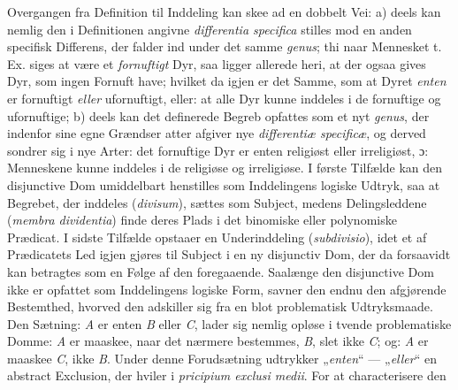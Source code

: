 \documentclass[12pt]{book}
\newcommand{\dsi}{\textup{ɔ:}}
\newcommand{\opage}[1]{\marginnote{\footnotesize\textit{[#1]}}}
\begin{document}
Overgangen fra Definition til Inddeling kan skee ad en dobbelt Vei: a) deels kan
nemlig den i Definitionen angivne \textit{differentia specifica} stilles mod en
anden specifisk Differens, der falder ind under det samme \textit{genus}; thi naar
Mennesket t. Ex. siges at være et \emph{fornuftigt} Dyr, saa ligger allerede heri,
at der ogsaa gives Dyr, som ingen Fornuft have; hvilket da igjen er det Samme, som
at Dyret \emph{enten} er fornuftigt \emph{eller} ufornuftigt, eller: at alle Dyr
kunne inddeles i de fornuftige og ufornuftige; b) deels kan det definerede Begreb
opfattes som et nyt \textit{genus}, der indenfor sine egne Grændser atter afgiver
nye \textit{differentiæ specificæ}, og derved sondrer sig i nye Arter: det
fornuftige Dyr er enten religiøst eller irreligiøst, \dsi{} Menneskene kunne
inddeles i de religiøse og irreligiøse. I første Tilfælde kan den disjunctive Dom
umiddelbart henstilles som Inddelingens logiske Udtryk, saa at Begrebet, der
inddeles (\textit{divisum}), sættes som
\opage{65} Subject, medens Delingsleddene (\textit{membra dividentia}) finde deres Plads i
det binomiske eller polynomiske Prædicat. I sidste Tilfælde opstaaer en
Underinddeling (\textit{subdivisio}), idet et af Prædicatets Led igjen gjøres til
Subject i en ny disjunctiv Dom, der da forsaavidt kan betragtes som en Følge af
den foregaaende. Saalænge den disjunctive Dom ikke er opfattet som Inddelingens
logiske Form, savner den endnu den afgjørende Bestemthed, hvorved den adskiller
sig fra en blot problematisk Udtryksmaade. Den Sætning: \textit{A} er enten
\textit{B} eller \textit{C}, lader sig nemlig opløse i tvende problematiske Domme:
\textit{A} er maaskee, naar det nærmere bestemmes, \textit{B}, slet ikke
\textit{C}; og: \textit{A} er maaskee \textit{C}, ikke \textit{B}. Under denne
Forudsætning udtrykker „\emph{enten}“ --- „\emph{eller}“ en abstract Exclusion,
der hviler i \textit{pricipium exclusi medii}. For at characterisere den
\end{document}

